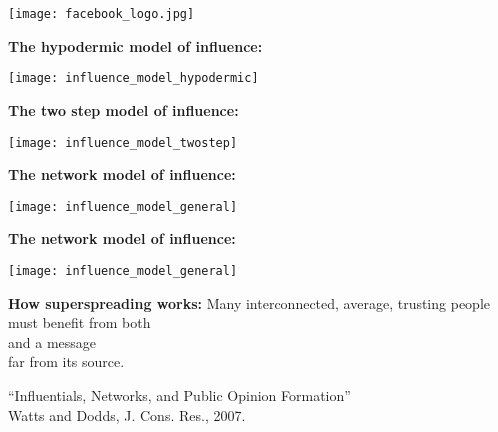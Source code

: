   \texttt{[image: facebook\_logo.jpg]}





  \textbf{The hypodermic model of influence:}

  \begin{center}
    \texttt{[image: influence\_model\_hypodermic]}    
  \end{center}



  \textbf{The two step model of influence:\cite{katz1955a}}

  \begin{center}
    \texttt{[image: influence\_model\_twostep]}    
  \end{center}


  \textbf{The network model of influence:}

  \begin{center}
    \texttt{[image: influence\_model\_general]}    
  \end{center}


  \textbf{The network model of influence:}

      
    \texttt{[image: influence\_model\_general]}    
    
    \textbf{How superspreading works:}
      Many interconnected, average, trusting people\\
      must benefit from both\\
       and  a message\\
      far from its source.
    
  



  \bigskip
  \bigskip

  \small{
    ``Influentials, Networks, and Public Opinion Formation''\cite{watts2007a}\\
    Watts and Dodds, J. Cons. Res., 2007.
  }



